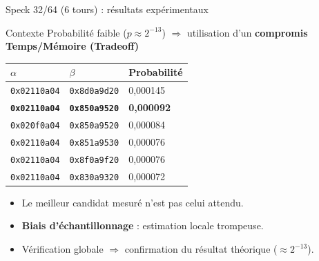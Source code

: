 \begin{frame}{Speck 32/64 (6 tours) : résultats expérimentaux}

    \begin{block}{Contexte}
        \small Probabilité faible ($p \approx 2^{-13}$) $\Rightarrow$ utilisation d’un \textbf{compromis Temps/Mémoire (Tradeoff)}
    \end{block}

    \vspace{0.2cm}

    \centering
    \renewcommand{\arraystretch}{1.2}
    \scriptsize
    \begin{tabular}{lll}
        \toprule
        \textbf{$\alpha$} & \textbf{$\beta$} & \textbf{Probabilité} \\
        \midrule
        \texttt{0x02110a04} & \texttt{0x8d0a9d20} & 0,000145 \\
        \textbf{\texttt{0x02110a04}} & \textbf{\texttt{0x850a9520}} & \textbf{0,000092} \\
        \texttt{0x020f0a04} & \texttt{0x850a9520} & 0,000084 \\
        \texttt{0x02110a04} & \texttt{0x851a9530} & 0,000076 \\
        \texttt{0x02110a04} & \texttt{0x8f0a9f20} & 0,000076 \\
        \texttt{0x02110a04} & \texttt{0x830a9320} & 0,000072 \\
        \bottomrule
    \end{tabular}

    \vspace{0.2cm}

    \begin{itemize}\small
        \item Le meilleur candidat mesuré n’est pas celui attendu.
        \item \textbf{Biais d’échantillonnage} : estimation locale trompeuse.
        \item Vérification globale $\Rightarrow$ confirmation du résultat théorique ($\approx 2^{-13}$).
    \end{itemize}

\end{frame}

